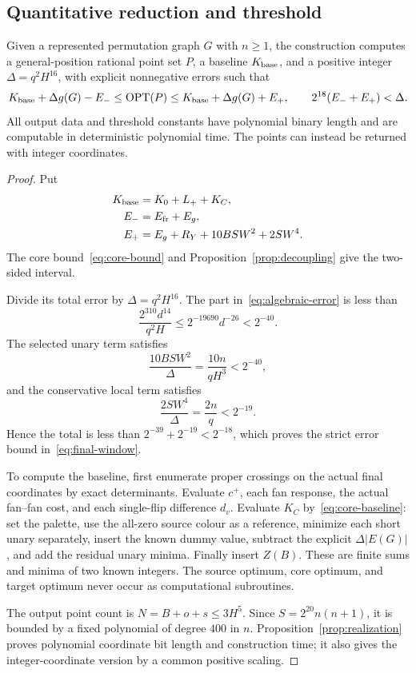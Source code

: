 \subsection{Quantitative reduction and threshold}
\begin{theorem}\label{thm:quantitative-reduction}
Given a represented permutation graph $G$ with $n\geq1$, the construction computes a general-position rational point set $P$, a baseline $K_{\rm base}$, and a positive integer $\Delta=q^2H^{16}$, with explicit nonnegative errors such that
\begin{equation}\label{eq:final-window}
K_{\rm base}+\Delta g(G)-E_-
\leq\operatorname{OPT}(P)\leq
K_{\rm base}+\Delta g(G)+E_+,\qquad
2^{18}(E_-+E_+)<\Delta.
\end{equation}
All output data and threshold constants have polynomial binary length and are computable in deterministic polynomial time. The points can instead be returned with integer coordinates.
\end{theorem}
\begin{proof}
Put
\begin{align}
K_{\rm base}&=K_0+L_++K_C,\notag\\
E_-&=E_{\rm fr}+E_g,\notag\\
E_+&=E_g+R_Y+10BSW^2+2SW^4.
\label{eq:final-errors}
\end{align}
The core bound~\eqref{eq:core-bound} and Proposition~\ref{prop:decoupling} give the two-sided interval.

Divide its total error by $\Delta=q^2H^{16}$. The part in~\eqref{eq:algebraic-error} is less than
\[
\frac{2^{310}d^{14}}{q^2H}
\leq2^{-19690}d^{-26}<2^{-40}.
\]
The selected unary term satisfies
\[
\frac{10BSW^2}{\Delta}=\frac{10n}{qH^3}<2^{-40},
\]
and the conservative local term satisfies
\[
\frac{2SW^4}{\Delta}=\frac{2n}{q}<2^{-19}.
\]
Hence the total is less than $2^{-39}+2^{-19}<2^{-18}$, which proves the strict error bound in~\eqref{eq:final-window}.

To compute the baseline, first enumerate proper crossings on the actual final coordinates by exact determinants. Evaluate $c^+$, each fan response, the actual fan--fan cost, and each single-flip difference $d_v$. Evaluate $K_C$ by~\eqref{eq:core-baseline}: set the palette, use the all-zero source colour as a reference, minimize each short unary separately, insert the known dummy value, subtract the explicit $\Delta|E(G)|$, and add the residual unary minima. Finally insert $Z(B)$. These are finite sums and minima of two known integers. The source optimum, core optimum, and target optimum never occur as computational subroutines.

The output point count is $N=B+o+s\leq3H^5$. Since $S=2^{20}n(n+1)$, it is bounded by a fixed polynomial of degree $400$ in $n$. Proposition~\ref{prop:realization} proves polynomial coordinate bit length and construction time; it also gives the integer-coordinate version by a common positive scaling.
\end{proof}

